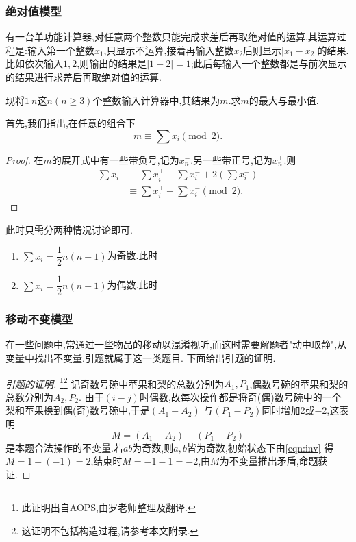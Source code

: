 \subsubsection{绝对值模型}
\begin{problem}
    有一台单功能计算器,对任意两个整数只能完成求差后再取绝对值的运算,其运算过程是:输入第一个整数$x_1$,只显示不运算,接着再输入整数$x_2$后则显示$|x_1-x_2|$的结果.比如依次输入$1,2$,则输出的结果是$|1-2|=1$;此后每输入一个整数都是与前次显示的结果进行求差后再取绝对值的运算.

    现将$1~n$这$n(n\geq 3)$个整数输入计算器中,其结果为$m$.求$m$的最大与最小值.
\end{problem}
\begin{solution}
    首先,我们指出,在任意的组合下\begin{equation}
        m\equiv \sum x_i\pmod2.
    \end{equation}
    \begin{proof}
        在$m$的展开式中有一些带负号,记为$x_n^{-}.$另一些带正号,记为$x_n^{+}.$则
        \begin{align*}
            \sum x_i&\equiv\sum x_i^{+}-\sum x_i^{-}+2\left( \sum x_i^{-} \right)\\
        &\equiv\sum x_i^{+}-\sum x_i^{-}\pmod 2.
        \end{align*}
       
    \end{proof}
    此时只需分两种情况讨论即可.
    \begin{enumerate}
        \item $\sum x_i=\dfrac{1}{2}n(n+1)$为奇数.此时
        \item $\sum x_i=\dfrac{1}{2}n(n+1)$为偶数.此时
    \end{enumerate}
\end{solution}
\subsubsection{移动不变模型}
在一些问题中,常通过一些物品的移动以混淆视听,而这时需要解题者"动中取静",从变量中找出不变量.引题就属于这一类题目.
下面给出引题的证明.
\begin{proof}[引题的证明]\footnote{此证明出自AOPS,由罗老师整理及翻译.}\footnote{这证明不包括构造过程,请参考本文附录.}
    记奇数号碗中苹果和梨的总数分别为$A_1,P_1$,偶数号碗的苹果和梨的总数分别为$A_2,P_2$.
    由于$(i-j)$时偶数,故每次操作都是将奇(偶)数号碗中的一个梨和苹果换到偶(奇)数号碗中,于是$(A_1-A_2)$
    与$(P_1-P_2)$同时增加$2$或$-2$,这表明\begin{equation}
        M=(A_1-A_2)-(P_1-P_2)\label{eqn:inv}
    \end{equation}
    是本题合法操作的不变量.若$ab$为奇数,则$a,b$皆为奇数,初始状态下由\eqref{eqn:inv}
    得$M=1-(-1)=2$,结束时$M=-1-1=-2$,由$M$为不变量推出矛盾,命题获证.
    \end{proof}
    
